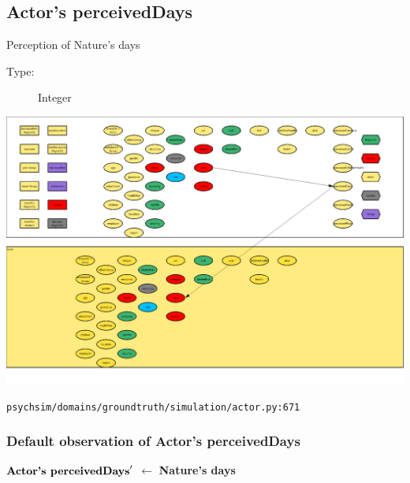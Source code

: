 \documentclass{article}%
\begin{document}
\subsection{Actor's perceivedDays}%
\label{subsec:Actor's perceivedDays}%
Perception of Nature's days%
\begin{description}%
\item[Type:]%
Integer%
\end{description}%
\includegraphics[width=\textwidth]{images/perceivedDaysOfActor.png}%
\begin{flushleft}%
\verb|psychsim/domains/groundtruth/simulation/actor.py:671|%
\end{flushleft}%
\subsubsection{Default observation of Actor's perceivedDays}%
\label{ssubsec:Default observation of Actor's perceivedDays}%
\begin{flushleft}%
$\mbox{\textbf{Actor's perceivedDays}} '$%
$\leftarrow$%
\textbf{Nature's days}%
\end{flushleft}

%
\end{document}
